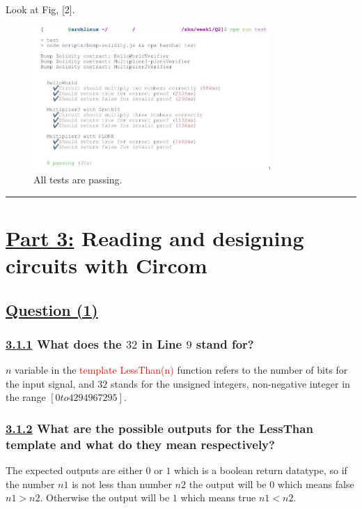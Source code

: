 \documentclass[letterpaper, 10 pt, conference]{ieeeconf}  %
\begin{document}
Look at Fig, [2].

\begin{figure}[htp]
    \centering
    \includegraphics[width=9cm]{assets/photo_2022-07-11_08-53-09}
    \caption{All tests are passing.}
    \label{fig:galaxy}
\end{figure}

\noindent\rule{8cm}{0.4pt}




\section{\textbf{\underline{Part 3:}} Reading and designing circuits with Circom}

\subsection{\textbf{}\underline{Question (1)}}
\subsubsection{\textbf{\underline{3.1.1} What does the $32$ in Line $9$ stand for?}}

$n$ variable in the \textcolor{red}{template LessThan(n)} function refers to the number of bits for the input signal, and $32$ stands for the unsigned integers, non-negative integer in the range $[0 to 4294967295]$.

\subsubsection{\textbf{\underline{3.1.2} What are the possible outputs for the LessThan template and what do they mean respectively?}}

The expected outputs are either $0$ or $1$ which is a boolean return datatype, so if the number $n1$ is not less than number $n2$ the output will be $0$ which means false $n1 > n2$. Otherwise the output will be $1$ which means true $n1 < n2$.
\end{document}
